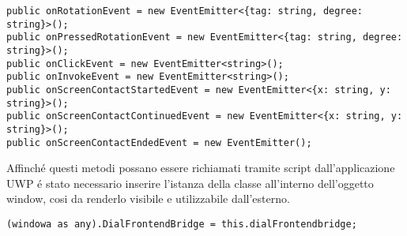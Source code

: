 \vspace{1.0cm}
\begin{lstlisting}[caption={EventEmitter esposti da DialFrontendBridge},style=javaScriptCode]
public onRotationEvent = new EventEmitter<{tag: string, degree: string}>();
public onPressedRotationEvent = new EventEmitter<{tag: string, degree: string}>();
public onClickEvent = new EventEmitter<string>();
public onInvokeEvent = new EventEmitter<string>();
public onScreenContactStartedEvent = new EventEmitter<{x: string, y: string}>();
public onScreenContactContinuedEvent = new EventEmitter<{x: string, y: string}>();
public onScreenContactEndedEvent = new EventEmitter();
\end{lstlisting} 
\vspace{1.0cm}

Affinché questi metodi possano essere richiamati tramite script dall'applicazione UWP é stato necessario inserire l'istanza della classe all'interno dell'oggetto window, cosi da renderlo visibile e utilizzabile dall'esterno.\\

\vspace{1.0cm}
\begin{lstlisting}[caption={Inserimento classe DialFrontendbridge in window },style=javaScriptCode]
(windowa as any).DialFrontendBridge = this.dialFrontendbridge;
\end{lstlisting} 
\vspace{1.0cm}

